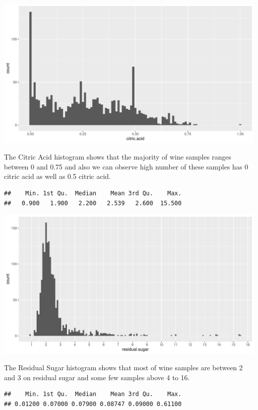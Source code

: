 \documentclass[]{article}
\begin{document}
\begin{center}\includegraphics{Figs/unnamed-chunk-3-1} \end{center}

The Citric Acid histogram shows that the majority of wine samples ranges
between 0 and 0.75 and also we can observe high number of these samples
has 0 citric acid as well as 0.5 citric acid.

\begin{verbatim}
##    Min. 1st Qu.  Median    Mean 3rd Qu.    Max. 
##   0.900   1.900   2.200   2.539   2.600  15.500
\end{verbatim}

\begin{center}\includegraphics{Figs/unnamed-chunk-4-1} \end{center}

The Residual Sugar histogram shows that most of wine samples are between
2 and 3 on residual sugar and some few samples above 4 to 16.

\begin{verbatim}
##    Min. 1st Qu.  Median    Mean 3rd Qu.    Max. 
## 0.01200 0.07000 0.07900 0.08747 0.09000 0.61100
\end{verbatim}
\end{document}
